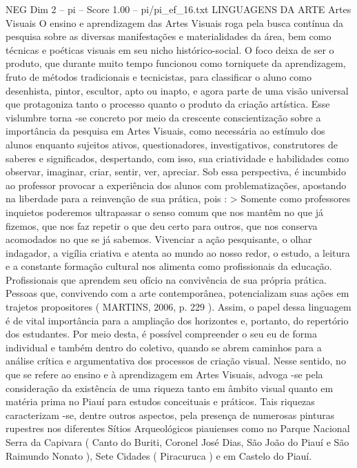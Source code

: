 \begin{textsample}{NEG Dim 2 – pi – Score 1.00 – pi/pi\_ef\_16.txt}  \label{ex:f2_neg_195}
LINGUAGENS DA ARTE Artes Visuais O ensino e aprendizagem das Artes Visuais roga pela busca contínua da pesquisa sobre as diversas manifestações e materialidades da área, bem como técnicas e poéticas visuais em seu nicho histórico-social.
O foco deixa de ser o produto, que durante muito tempo funcionou como torniquete da aprendizagem, fruto de métodos tradicionais e tecnicistas, para classificar o aluno como desenhista, pintor, escultor, apto ou inapto, e agora parte de uma visão universal que protagoniza tanto o processo quanto o produto da criação artística.
Esse vislumbre torna -se concreto por meio da crescente conscientização sobre a importância da pesquisa em Artes Visuais, como necessária ao estímulo dos alunos enquanto sujeitos ativos, questionadores, investigativos, construtores de saberes e significados, despertando, com isso, sua criatividade e habilidades como observar, imaginar, criar, sentir, ver, apreciar.
Sob essa perspectiva, é incumbido ao professor provocar a experiência dos alunos com problematizações, apostando na liberdade para a reinvenção de sua prática, pois : > Somente como professores inquietos poderemos ultrapassar o senso comum que nos mantêm no que já fizemos, que nos faz repetir o que deu certo para outros, que nos conserva acomodados no que se já sabemos.
Vivenciar a ação pesquisante, o olhar indagador, a vigília criativa e atenta ao mundo ao nosso redor, o estudo, a leitura e a constante formação cultural nos alimenta como profissionais da educação.
Profissionais que aprendem seu ofício na convivência de sua própria prática.
Pessoas que, convivendo com a arte contemporânea, potencializam suas ações em trajetos propositores ( MARTINS, 2006, p. 229 ).
Assim, o papel dessa linguagem é de vital importância para a ampliação dos horizontes e, portanto, do repertório dos estudantes.
Por meio desta, é possível compreender o seu eu de forma individual e também dentro do coletivo, quando se abrem caminhos para a análise crítica e argumentativa dos processos de criação visual.
Nesse sentido, no que se refere ao ensino e à aprendizagem em Artes Visuais, advoga -se pela consideração da existência de uma riqueza tanto em âmbito visual quanto em matéria prima no Piauí para estudos conceituais e práticos.
Tais riquezas caracterizam -se, dentre outros aspectos, pela presença de numerosas pinturas rupestres nos diferentes Sítios Arqueológicos piauienses como no Parque Nacional Serra da Capivara ( Canto do Buriti, Coronel José Dias, São João do Piauí e São Raimundo Nonato ), Sete Cidades ( Piracuruca ) e em Castelo do Piauí.

\end{textsample}
